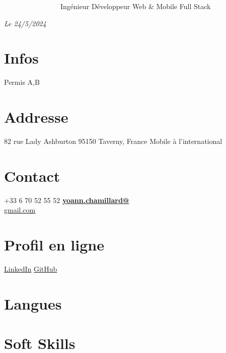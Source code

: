 \documentclass[]{friggeri-cv}
\begin{document}
      {~~~~~~~~~~~~~~~~Ingénieur Développeur Web \& Mobile Full Stack}
      {}

\begin{aside}
	\emph{Le 24/5/2024} \hspace*{8mm}
\section{Infos}
Permis A,B
\section{Addresse}
82 rue Lady Ashburton
95150 Taverny,
France
Mobile à l'international
\section{Contact}
+33 6 70 52 55 52
\href{mailto:yoann.chamillard@gmail.com}{\textbf{yoann.chamillard@}\\gmail.com}
\section{Profil en ligne}
\href{http://fr.linkedin.com/in/yoannchamillard}{LinkedIn}
\href{https://github.com/Nokheenig?tab=stars}{GitHub}
\section{Langues}
\section{Soft Skills}

\end{aside}
\end{document}
